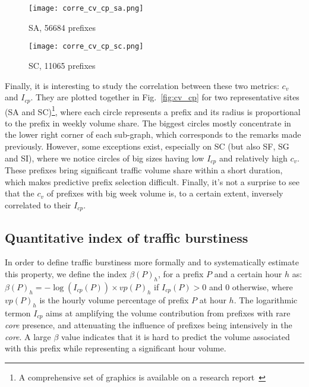 \documentclass[10pt, conference,letterpaper]{IEEEtran}
\begin{document}
\begin{figure*}[!tb]
\centering
		\centering
        \begin{subfigure}[b]{0.49\textwidth}
        \centering
                \texttt{[image: corre\_cv\_cp\_sa.png]}
                \caption{SA, 56684 prefixes}
                \label{fig:cv_cp_sa}
        \end{subfigure}
        \hfill
\begin{subfigure}[b]{0.49\textwidth}
        \centering
                \texttt{[image: corre\_cv\_cp\_sc.png]}
                \caption{SC, 11065 prefixes}
                \label{fig:cv_cp_sc}
        \end{subfigure}
\caption{Relation between $I_{cp}$ and $c_v$}  \label{fig:cv_cp}
\end{figure*}
Finally, it is interesting to study the correlation between these two metrics: $c_v$ and $I_{cp}$. They are plotted  together in Fig.~\ref{fig:cv_cp} for two representative sites (SA and SC)\footnote{A comprehensive set of graphics is available on a research report~\cite{RR}}, where each circle represents a prefix and its radius is proportional to the prefix in weekly volume share.
The biggest circles mostly concentrate in the lower right corner of each sub-graph, which corresponds to the remarks made previously.
However, some exceptions exist, especially on SC (but also SF, SG and SI), where we notice circles of big sizes having low $I_{cp}$ and relatively high $c_v$.
These prefixes bring significant traffic volume share within a short duration, which makes predictive prefix selection difficult. 
Finally, it's not a surprise to see that the $c_v$ of prefixes with big week volume is, to a certain extent, inversely correlated to their $I_{cp}$. 


\subsection{Quantitative index of traffic burstiness}

In order to define traffic burstiness more formally and to systematically estimate this property, we define 
the index $\beta(P)_h$, for a prefix $P$ and  a certain hour $h$ as:
$\beta(P)_h = -\log(I_{cp}(P)) \times vp(P)_h$ if $I_{cp}(P) > 0$ and $0$ otherwise, where $vp(P)_h$ is the hourly volume percentage of prefix $P$ at hour $h$.
The logarithmic termon $I_{cp}$ aims at amplifying the volume contribution from prefixes with rare \textit{core} presence, and attenuating the influence of prefixes being intensively in the \textit{core}.
A large $\beta$ value indicates that it is hard to predict the volume associated with this prefix while representing a significant hour volume.
\end{document}
